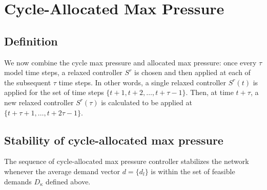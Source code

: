 \section{Cycle-Allocated Max Pressure}

\subsection*{Definition}

We now combine the cycle max pressure and allocated max pressure: once every $\tau$ model time steps, a relaxed controller $S^r$ is chosen and then applied at each of the subsequent $\tau$ time steps. In other words, a single relaxed controller $S^r(t)$ is applied for the set of time steps $\{t+1, t+2, \ldots, t+\tau -1 \}$. Then, at time $t+\tau$, a new relaxed controller $S^r (\tau)$ is calculated to be applied at $\{t+\tau+1, \ldots, t+2\tau -1 \}$. 

\subsection*{Stability of cycle-allocated max pressure}
\begin{Thm}\label{StabCycleDistributedMP}
The sequence of cycle-allocated max pressure controller stabilizes the network
 whenever the average demand vector $d = \lbrace d_{l}\rbrace$ is within the set of feasible demands
$ D_{\kappa}$ defined above.
\end{Thm}

\vspace{0.5cm}

